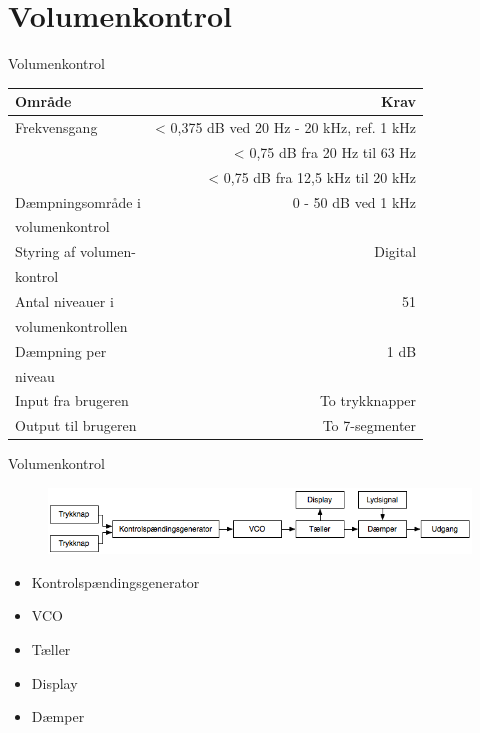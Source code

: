 \section{Volumenkontrol}

\begin{frame}{Volumenkontrol}
\scriptsize{
\begin{table}[h]
\centering
\begin{tabular}{l|r}
\hline\hline
Område & Krav \\
\hline\hline
Frekvensgang & < 0,375 dB ved 20 Hz - 20 kHz, ref. 1 kHz \\
& < 0,75 dB fra 20 Hz til 63 Hz \\
& < 0,75 dB fra 12,5 kHz til 20 kHz \\[4pt]
Dæmpningsområde i & 0 - 50 dB ved 1 kHz \\
volumenkontrol & \\[4pt]
Styring af volumen- & Digital \\
kontrol & \\[4pt]
Antal niveauer i & 51 \\
volumenkontrollen & \\[4pt]
Dæmpning per & 1 dB \\
niveau & \\[4pt]
Input fra brugeren & To trykknapper \\[4pt]
Output til brugeren & To 7-segmenter \\
\hline\hline
\end{tabular}
\end{table}}
\end{frame}

\begin{frame}{Volumenkontrol}
\begin{figure}[h]
\centering
\includegraphics[scale=0.4]{images/blokdiagram-volumenkontrol.png}
\end{figure}

\begin{itemize}
\item Kontrolspændingsgenerator
\item VCO
\item Tæller
\item Display
\item Dæmper
\end{itemize}
\end{frame}